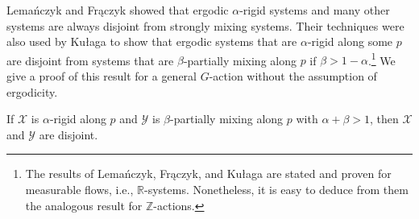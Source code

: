 \documentclass[graybox]{svmult}
\theoremstyle{definition}
\begin{document}
Lema\'nczyk and Fr\k{a}czyk \cite{IETsAreDisjointFromSM} showed that ergodic $\alpha$-rigid systems and many other systems are always disjoint from strongly mixing systems.
Their techniques were also used by Ku{\l}aga \cite[Proposition 6(ii)]{IsomorphismOfCartesianProducts} to show that ergodic systems that are $\alpha$-rigid along some $p$ are disjoint from systems that are $\beta$-partially mixing along $p$ if $\beta > 1-\alpha$.\footnote{The results of Lema\'nczyk, Fr\k{a}czyk, and Ku{\l}aga are stated and proven for measurable flows, i.e., $\mathbb{R}$-systems. Nonetheless, it is easy to deduce from them the analogous result for $\mathbb{Z}$-actions.}
We give a proof of this result for a general $G$-action without the assumption of ergodicity.

\begin{theorem}\label{thm:PartiallyRigidMixingDisjointness}
    If $\mathcal{X}$ is $\alpha$-rigid along $p$ and $\mathcal{Y}$ is $\beta$-partially mixing along $p$ with $\alpha+\beta > 1$, then $\mathcal{X}$ and $\mathcal{Y}$ are disjoint.
\end{theorem}
\end{document}

